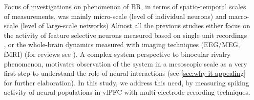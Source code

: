 Focus of investigations on phenomenon of BR, in terms of spatio-temporal scales of measurements,
was mainly micro-scale (level of individual neurons) and macro-scale (level of large-scale networks)
Almost all the previous studies either focus on the activity of feature selective neurons measured based on single unit recordings
\cite{lehkyNoBinocularRivalry1996,sheinbergRoleTemporalCortical1997,kelirisRolePrimaryVisual2010,bahmaniNeuralCorrelatesBinocular2011,panagiotaropoulosNeuronalDischargesGamma2012},
or the whole-brain dynamics measured with imaging techniques (EEG/MEG, fMRI)
\cite{wangBrainMechanismsSimple2013,lumerNeuralCorrelatesPerceptual1998,srinivasanIncreasedSynchronizationNeuromagnetic1999b,hippOscillatorySynchronizationLargescale2011a,doesburgRhythmsConsciousnessBinocular2009b,tononiNeuralCorrelatesConsciousness2008,imamogluChangesFunctionalConnectivity2012}
(for reviews see \cite{blakeVisualCompetition2002a,panagiotaropoulosSubjectiveVisualPerception2014a,kochNeuralCorrelatesConsciousness2016}).
A complex system perspective to binocular rivalry phenomenon, motivates observation of the system in a mesoscopic scale as a very first step to understand the role of neural interactions (see \autoref{sec:why-it-appealing} for further elaboration).
In this study, we address this need, by measuring spiking activity of neural populations in vlPFC with multi-electrode recording techniques.


